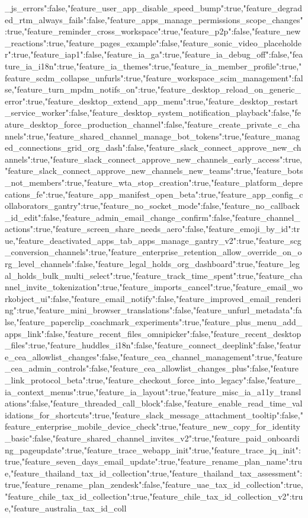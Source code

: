 {_js_errors":false,"feature_user_app_disable_speed_bump":true,"feature_degraded_rtm_always_fails":false,"feature_apps_manage_permissions_scope_changes":true,"feature_reminder_cross_workspace":true,"feature_p2p":false,"feature_new_reactions":true,"feature_pages_example":false,"feature_sonic_video_placeholder":true,"feature_iap1":false,"feature_ia_ga":true,"feature_ia_debug_off":false,"feature_ia_i18n":true,"feature_ia_themes":true,"feature_ia_member_profile":true,"feature_scdm_collapse_unfurls":true,"feature_workspace_scim_management":false,"feature_turn_mpdm_notifs_on":true,"feature_desktop_reload_on_generic_error":true,"feature_desktop_extend_app_menu":true,"feature_desktop_restart_service_worker":false,"feature_desktop_system_notification_playback":false,"feature_desktop_force_production_channel":false,"feature_create_private_c_channels":true,"feature_shared_channel_manage_bot_tokens":true,"feature_managed_connections_grid_org_dash":false,"feature_slack_connect_approve_new_channels":true,"feature_slack_connect_approve_new_channels_early_access":true,"feature_slack_connect_approve_new_channels_new_teams":true,"feature_bots_not_members":true,"feature_wta_stop_creation":true,"feature_platform_deprecations_fe":true,"feature_app_manifest_open_beta":true,"feature_app_config_collaborators_gantry":true,"feature_no_socket_mode":false,"feature_no_callback_id_edit":false,"feature_admin_email_change_confirm":false,"feature_channel_actions":true,"feature_screen_share_needs_aero":false,"feature_emoji_by_id":true,"feature_deactivated_apps_tab_apps_manage_gantry_v2":true,"feature_scg_conversion_channels":true,"feature_enterprise_retention_allow_override_on_org_level_channels":false,"feature_legal_holds_org_dashboard":true,"feature_legal_holds_bulk_multi_select":true,"feature_track_time_spent":true,"feature_channel_invite_tokenization":true,"feature_imports_cancel":true,"feature_email_workobject_ui":false,"feature_email_notify":false,"feature_improved_email_rendering":true,"feature_mini_browser_translations":false,"feature_unfurl_metadata":false,"feature_paperclip_coachmark_experiments":true,"feature_plus_menu_add_apps_link":false,"feature_recent_files_omnipicker":false,"feature_recent_desktop_files":true,"feature_huddles_i18n":false,"feature_connect_deeplink":false,"feature_cea_allowlist_changes":false,"feature_cea_channel_management":true,"feature_cea_admin_controls":false,"feature_cea_allowlist_changes_plus":false,"feature_link_protocol_beta":true,"feature_checkout_force_into_legacy":false,"feature_ia_context_menus":true,"feature_ia_layout":true,"feature_misc_ia_a11y_translations":false,"feature_threaded_call_block":false,"feature_enable_read_time_validations_for_shortcuts":true,"feature_slack_message_attachment_tooltip":false,"feature_enterprise_mobile_device_check":true,"feature_new_copy_for_identity_basic":false,"feature_shared_channel_invites_v2":true,"feature_paid_onboarding_pageupdate":true,"feature_trace_webapp_init":true,"feature_trace_jq_init":true,"feature_seven_days_email_update":true,"feature_rename_plan_name":true,"feature_thailand_tax_id_collection":true,"feature_thailand_tax_assessment":true,"feature_rename_plan_zendesk":false,"feature_uae_tax_id_collection":true,"feature_chile_tax_id_collection":true,"feature_chile_tax_id_collection_v2":true,"feature_australia_tax_id_coll}
